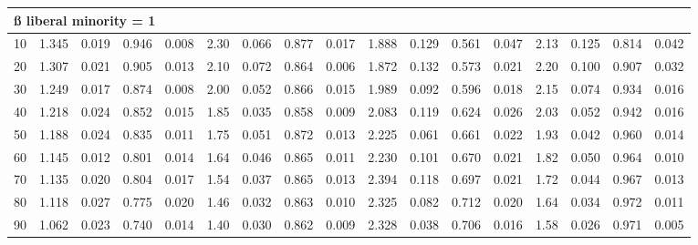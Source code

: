 \documentclass[
]{article}
\begin{document}
\begin{table}[H]
\begin{table}
{\begin{tabular}{r|r|r|r|r|r|r|r|r|r|r|r|r|r|r|r|r}
\hline
\multicolumn{17}{l}{\textbf{ß liberal minority = 1}}\\
\hline
\hspace{1em}10 & 1.345 & 0.019 & 0.946 & 0.008 & 2.30 & 0.066 & 0.877 & 0.017 & 1.888 & 0.129 & 0.561 & 0.047 & 2.13 & 0.125 & 0.814 & 0.042\\
\hline
\hspace{1em}20 & 1.307 & 0.021 & 0.905 & 0.013 & 2.10 & 0.072 & 0.864 & 0.006 & 1.872 & 0.132 & 0.573 & 0.021 & 2.20 & 0.100 & 0.907 & 0.032\\
\hline
\hspace{1em}30 & 1.249 & 0.017 & 0.874 & 0.008 & 2.00 & 0.052 & 0.866 & 0.015 & 1.989 & 0.092 & 0.596 & 0.018 & 2.15 & 0.074 & 0.934 & 0.016\\
\hline
\hspace{1em}40 & 1.218 & 0.024 & 0.852 & 0.015 & 1.85 & 0.035 & 0.858 & 0.009 & 2.083 & 0.119 & 0.624 & 0.026 & 2.03 & 0.052 & 0.942 & 0.016\\
\hline
\hspace{1em}50 & 1.188 & 0.024 & 0.835 & 0.011 & 1.75 & 0.051 & 0.872 & 0.013 & 2.225 & 0.061 & 0.661 & 0.022 & 1.93 & 0.042 & 0.960 & 0.014\\
\hline
\hspace{1em}60 & 1.145 & 0.012 & 0.801 & 0.014 & 1.64 & 0.046 & 0.865 & 0.011 & 2.230 & 0.101 & 0.670 & 0.021 & 1.82 & 0.050 & 0.964 & 0.010\\
\hline
\hspace{1em}70 & 1.135 & 0.020 & 0.804 & 0.017 & 1.54 & 0.037 & 0.865 & 0.013 & 2.394 & 0.118 & 0.697 & 0.021 & 1.72 & 0.044 & 0.967 & 0.013\\
\hline
\hspace{1em}80 & 1.118 & 0.027 & 0.775 & 0.020 & 1.46 & 0.032 & 0.863 & 0.010 & 2.325 & 0.082 & 0.712 & 0.020 & 1.64 & 0.034 & 0.972 & 0.011\\
\hline
\hspace{1em}90 & 1.062 & 0.023 & 0.740 & 0.014 & 1.40 & 0.030 & 0.862 & 0.009 & 2.328 & 0.038 & 0.706 & 0.016 & 1.58 & 0.026 & 0.971 & 0.005\\
\hline
\end{tabular}}
\end{table}
\end{table}
\end{document}
